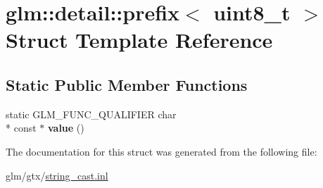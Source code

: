 \hypertarget{structglm_1_1detail_1_1prefix_3_01uint8__t_01_4}{\section{glm\-:\-:detail\-:\-:prefix$<$ uint8\-\_\-t $>$ Struct Template Reference}
\label{structglm_1_1detail_1_1prefix_3_01uint8__t_01_4}
}
\subsection*{Static Public Member Functions}
\begin{DoxyCompactItemize}
\item 
\hypertarget{structglm_1_1detail_1_1prefix_3_01uint8__t_01_4_a890818b4dedbe09730336c1ae3913339}{static G\-L\-M\-\_\-\-F\-U\-N\-C\-\_\-\-Q\-U\-A\-L\-I\-F\-I\-E\-R char \\*
const $\ast$ {\bfseries value} ()}\label{structglm_1_1detail_1_1prefix_3_01uint8__t_01_4_a890818b4dedbe09730336c1ae3913339}

\end{DoxyCompactItemize}


The documentation for this struct was generated from the following file\-:\begin{DoxyCompactItemize}
\item 
glm/gtx/\hyperlink{string__cast_8inl}{string\-\_\-cast.\-inl}\end{DoxyCompactItemize}
